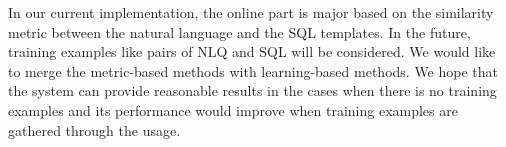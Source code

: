 \documentclass{vldb}
\begin{document}
In our current implementation, the online part is major based on the similarity metric between the natural language and the SQL templates.  In the future, training examples like pairs of NLQ and SQL will be considered.  We would like to merge the metric-based methods with learning-based methods.  We hope that the system can provide reasonable results in the cases when there is no training examples and its performance would improve when training examples are gathered through the usage.    



\end{document}
